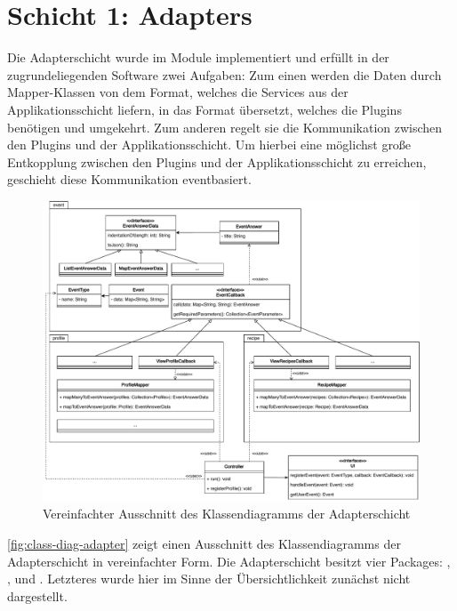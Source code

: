 \section{Schicht 1: Adapters}
Die Adapterschicht wurde im Module \href{https://github.com/anditru/quickie/tree/bb41442c7f1ffbfcd3117cd86a40f7932e543a33/1-quickie-adapters}{} implementiert und erfüllt in der zugrundeliegenden Software zwei Aufgaben: Zum einen werden die Daten durch Mapper-Klassen von dem Format, welches die Services aus der Applikationsschicht liefern, in das Format übersetzt, welches die Plugins benötigen und umgekehrt. Zum anderen regelt sie die Kommunikation zwischen den Plugins und der Applikationsschicht. Um hierbei eine möglichst große Entkopplung zwischen den Plugins und der Applikationsschicht zu erreichen, geschieht diese Kommunikation eventbasiert.

\begin{figure}[ht!]
    \includegraphics[width=0.98\columnwidth]{../diagrams/adapter_uml.pdf}
    \caption{Vereinfachter Ausschnitt des Klassendiagramms der Adapterschicht}
    \label{fig:class-diag-adapter}
\end{figure}

\autoref{fig:class-diag-adapter} zeigt einen Ausschnitt des Klassendiagramms der Adapterschicht in vereinfachter Form. Die Adapterschicht besitzt vier Packages: \href{https://github.com/anditru/quickie/tree/bb41442c7f1ffbfcd3117cd86a40f7932e543a33/1-quickie-adapters/src/main/java/org/pinkcrazyunicorn/quickie/adapters/callbacks}{}, \href{https://github.com/anditru/quickie/tree/bb41442c7f1ffbfcd3117cd86a40f7932e543a33/1-quickie-adapters/src/main/java/org/pinkcrazyunicorn/quickie/adapters/event}{}, \href{https://github.com/anditru/quickie/tree/bb41442c7f1ffbfcd3117cd86a40f7932e543a33/1-quickie-adapters/src/main/java/org/pinkcrazyunicorn/quickie/adapters/mappers}{} und \href{https://github.com/anditru/quickie/tree/bb41442c7f1ffbfcd3117cd86a40f7932e543a33/1-quickie-adapters/src/main/java/org/pinkcrazyunicorn/quickie/adapters/persistence}{}. Letzteres wurde hier im Sinne der Übersichtlichkeit zunächst nicht dargestellt.

